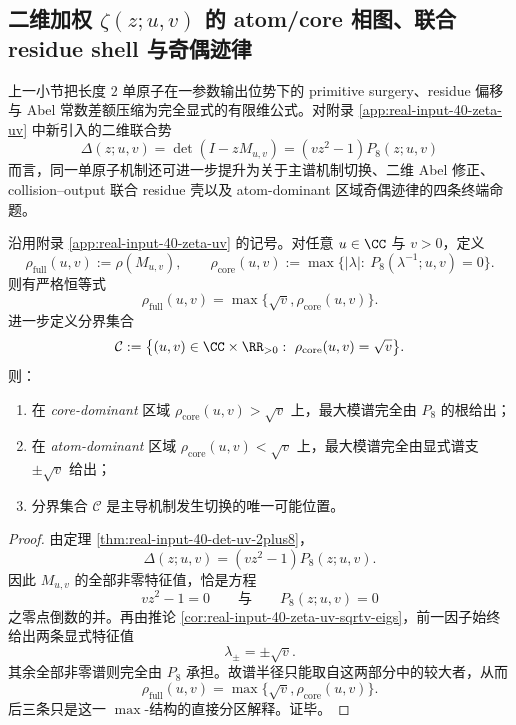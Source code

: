 \subsection{二维加权 \texorpdfstring{$\zeta(z;u,v)$}{zeta(z;u,v)} 的 atom/core 相图、联合 residue shell 与奇偶迹律}\label{subsec:conclusion-realinput40-uv-atomcore-phase-shell-trace}
上一小节把长度 \(2\) 单原子在一参数输出位势下的 primitive surgery、residue 偏移与 Abel 常数差额压缩为完全显式的有限维公式。对附录 \ref{app:real-input-40-zeta-uv} 中新引入的二维联合势
\[
\Delta(z;u,v)=\det(I-zM_{u,v})=(vz^2-1)P_8(z;u,v)
\]
而言，同一单原子机制还可进一步提升为关于主谱机制切换、二维 Abel 修正、collision--output 联合 residue 壳以及 atom-dominant 区域奇偶迹律的四条终端命题。

\begin{theorem}\label{thm:conclusion-realinput40-uv-atomcore-spectral-radius-splitting}
沿用附录 \ref{app:real-input-40-zeta-uv} 的记号。对任意 \(u\in\CC\) 与 \(v>0\)，定义
\[
\rho_{\mathrm{full}}(u,v):=\rho(M_{u,v}),
\qquad
\rho_{\mathrm{core}}(u,v):=\max\bigl\{|\lambda|:\ P_8(\lambda^{-1};u,v)=0\bigr\}.
\]
则有严格恒等式
\[
\boxed{\;
\rho_{\mathrm{full}}(u,v)=\max\bigl\{\sqrt v,\rho_{\mathrm{core}}(u,v)\bigr\}.\;}
\]
进一步定义分界集合
\[
\mathcal C:=\bigl\{(u,v)\in\CC\times\RR_{>0}:\ \rho_{\mathrm{core}}(u,v)=\sqrt v\bigr\}.
\]
则：
\begin{enumerate}
  \item 在 \emph{core-dominant} 区域 \(\rho_{\mathrm{core}}(u,v)>\sqrt v\) 上，最大模谱完全由 \(P_8\) 的根给出；
  \item 在 \emph{atom-dominant} 区域 \(\rho_{\mathrm{core}}(u,v)<\sqrt v\) 上，最大模谱完全由显式谱支 \(\pm\sqrt v\) 给出；
  \item 分界集合 \(\mathcal C\) 是主导机制发生切换的唯一可能位置。
\end{enumerate}
\end{theorem}
\begin{proof}
由定理 \ref{thm:real-input-40-det-uv-2plus8}，
\[
\Delta(z;u,v)=(vz^2-1)P_8(z;u,v).
\]
因此 \(M_{u,v}\) 的全部非零特征值，恰是方程
\[
vz^2-1=0
\qquad\text{与}\qquad
P_8(z;u,v)=0
\]
之零点倒数的并。再由推论 \ref{cor:real-input-40-zeta-uv-sqrtv-eigs}，前一因子始终给出两条显式特征值
\[
\lambda_\pm=\pm\sqrt v.
\]
其余全部非零谱则完全由 \(P_8\) 承担。故谱半径只能取自这两部分中的较大者，从而
\[
\rho_{\mathrm{full}}(u,v)=\max\bigl\{\sqrt v,\rho_{\mathrm{core}}(u,v)\bigr\}.
\]
后三条只是这一 \(\max\)-结构的直接分区解释。证毕。
\end{proof}

